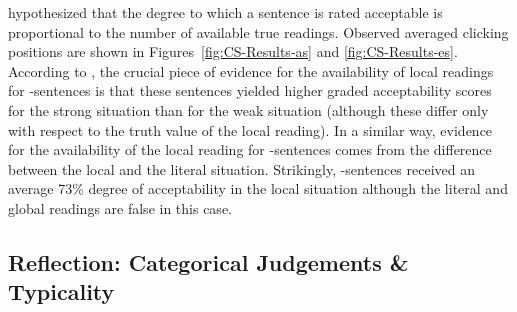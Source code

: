 \documentclass[fleqn,reqno,10pt,draft]{article}
\newcommand{\as}{\acro{as}}
\renewcommand{\es}{\acro{es}}
\begin{document}

\citeauthor{ChemlaSpector2010:Experimental-Ev} hypothesized that the
degree to which a sentence is rated acceptable is proportional to the
number of available true readings. Observed averaged clicking
positions are shown in Figures~\ref{fig:CS-Results-as} and
\ref{fig:CS-Results-es}.
%
%
According to \citeauthor{ChemlaSpector2010:Experimental-Ev}, the
crucial piece of evidence for the availability of local readings for
\as-sentences is that these sentences yielded higher graded
acceptability scores for the strong situation than for the weak
situation (although these differ only with respect to the truth value
of the local reading). In a similar way, evidence for the availability
of the local reading for \es-sentences comes from the difference
between the local and the literal situation. Strikingly, \es-sentences
received an average 73\% degree of acceptability in the local
situation although the literal and global readings are false in this
case.

\subsection{Reflection: Categorical Judgements \& Typicality}
\label{sec:local-read-categ}
\end{document}

